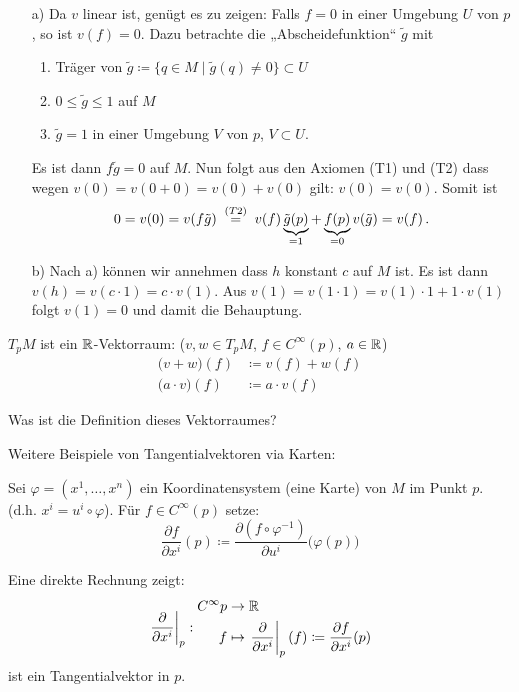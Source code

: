 \documentclass[a4paper,twoside,DIV15,BCOR12mm]{scrbook}
\renewcommand{\da}{\coloneqq}
\begin{document}
\begin{beweis}
\begin{itemize}
\item[a)] Da $v$ linear ist, genügt es zu zeigen: Falls $f=0$ in einer Umgebung $U$ von $p$, so ist $v(f)=0$. Dazu betrachte die „Abscheidefunktion“ $\tilde g$ mit 
\begin{enumerate}
\item Träger von $\tilde g \da \{ q\in M \mid \tilde g(q) \ne 0\} \subset U$
\item $0\le \tilde g \le 1$ auf $M$
\item $\tilde g = 1$ in einer Umgebung $V$ von $p$, $V \subset U$.
\end{enumerate}
Es ist dann $f\tilde g = 0$ auf $M$. Nun folgt aus den Axiomen (T1) und (T2) dass wegen $v(0)= v(0+0) = v(0) + v(0)$ gilt: $v(0)=v(0)$. Somit ist
\[
0 = v(0) = v(f\tilde g) \gleichwegen{(T2)} v(f)\underbrace{\tilde g(p)}_{=1} + \underbrace{f(p)}_{=0}v(\tilde g) = v(f)\,.
\]
\item[b)] Nach a) können wir annehmen dass $h$ konstant $c$ auf $M$ ist. Es ist dann $v(h)= v(c\cdot1) = c\cdot v(1)$. Aus $v(1) = v(1\cdot 1) = v(1)\cdot 1 + 1\cdot v(1)$ folgt $v(1)=0$ und damit die Behauptung.
\end{itemize}
\end{beweis}

$T_pM$ ist ein $\mathbb{R}$-Vektorraum: ($v,w \in T_pM$, $f\in C^\infty(p)$, $a\in\mathbb{R}$)
\begin{align*}
\bigl(v + w\bigr)(f) &\da v(f) + w(f) \\
\bigl(a\cdot v\bigr)(f)   &\da a\cdot v(f) 
\end{align*}

Was ist die Definition dieses Vektorraumes?

Weitere Beispiele von Tangentialvektoren via Karten:
\newcommand{\ptv}[1]{\left.\frac{\partial}{\partial x^{#1}}\right|_p}

Sei $\varphi=(x^1,\ldots,x^n)$ ein Koordinatensystem (eine Karte) von $M$ im Punkt $p$. (d.h. $x^i=u^i\circ\varphi$). Für $f\in C^{\infty}(p)$ setze:
\[
\frac{\partial f}{\partial x^i}(p) \da \frac{\partial (f\circ \varphi^{-1})}{\partial u^i}\bigl(\varphi(p)\bigr) %
\]

Eine direkte Rechnung zeigt:
\[
\ptv{i}:
\begin{aligned}
C^\infty{p} &\to \MdR \\
f &\mapsto \ptv{i}(f) \da \frac{\partial f}{\partial x^i}(p)
\end{aligned}
\]
ist ein Tangentialvektor in $p$.
\end{document}
